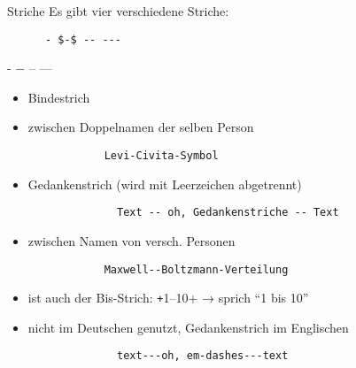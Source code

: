 \begin{frame}[fragile]{Striche}
  Es gibt vier verschiedene Striche:
  \begin{CodeExample}{0.49}
    \begin{verbatim}
      - $-$ -- ---
    \end{verbatim}
  \CodeResult
    \strut
    - $-$ -- ---
  \end{CodeExample}

  \begin{description}
    \item[- Bindestrich]
      \begin{itemize}
        \item Bindestrich
        \item zwischen Doppelnamen der selben Person
          \begin{verbatim}
            Levi-Civita-Symbol
          \end{verbatim}
      \end{itemize}
    \item[-- Halbgeviertstrich (en-dash)]
      \begin{itemize}
        \item Gedankenstrich (wird mit Leerzeichen abgetrennt)
          \begin{verbatim}
              Text -- oh, Gedankenstriche -- Text
          \end{verbatim}
          \smallskip
        \item zwischen Namen von versch. Personen
          \begin{verbatim}
            Maxwell--Boltzmann-Verteilung
          \end{verbatim}
          \smallskip
        \item ist auch der Bis-Strich:
          \texttt+1--10+ → sprich \enquote{1 bis 10}
      \end{itemize}
    \item[--- Geviertstrich (em-dash)]
      \begin{itemize}
          \item nicht im Deutschen genutzt, Gedankenstrich im Englischen
            \begin{verbatim}
              text---oh, em-dashes---text
            \end{verbatim}
      \end{itemize}
  \end{description}
\end{frame}

